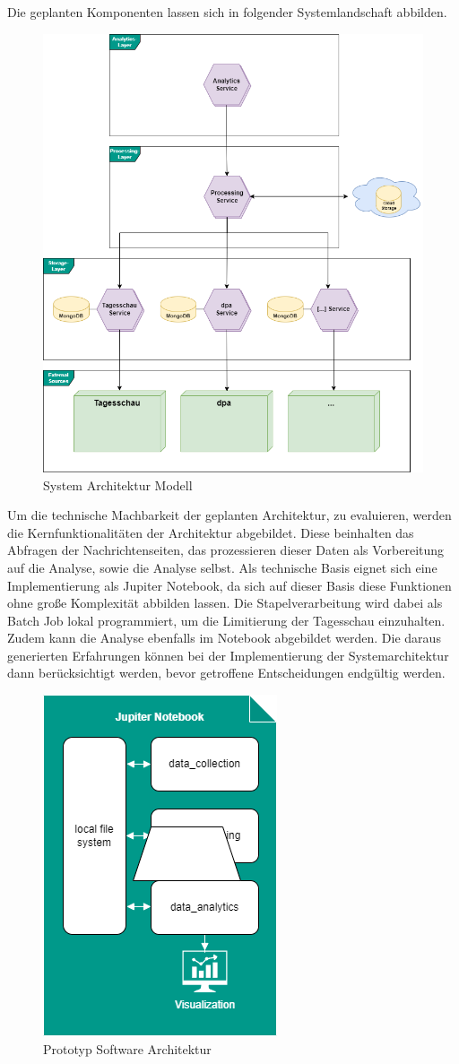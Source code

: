Die geplanten Komponenten lassen sich in folgender Systemlandschaft abbilden.

\begin{figure}
    \centering
    \includegraphics[width=0.5\linewidth]{abbildungen/System Architektur.drawio.png}
    \caption{System Architektur Modell}
    \label{fig:system-architecture}
\end{figure}
\newpage
Um die technische Machbarkeit der geplanten Architektur, zu evaluieren, werden die Kernfunktionalitäten der Architektur abgebildet. Diese beinhalten das Abfragen der Nachrichtenseiten, das prozessieren dieser Daten als Vorbereitung auf die Analyse, sowie die Analyse selbst. 
Als technische Basis eignet sich eine Implementierung als Jupiter Notebook, da sich auf dieser Basis diese Funktionen ohne große Komplexität abbilden lassen. 
Die Stapelverarbeitung wird dabei als Batch Job lokal programmiert, um die Limitierung der Tagesschau einzuhalten. Zudem kann die Analyse ebenfalls im Notebook abgebildet werden. 
Die daraus generierten Erfahrungen können bei der Implementierung der Systemarchitektur dann berücksichtigt werden, bevor getroffene Entscheidungen endgültig werden.

\begin{figure}
    \centering
    \includegraphics[width=0.5\linewidth]{abbildungen/Prototyp Architecture.drawio.png}
    \caption{Prototyp Software Architektur}
    \label{fig:prototyp-architecture}
\end{figure}